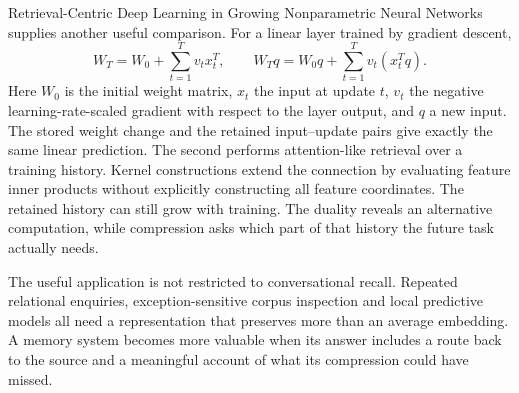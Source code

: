 Retrieval-Centric Deep Learning in Growing Nonparametric Neural Networks~\cite{Reference2026d462c2} supplies another useful comparison. For a linear layer trained by gradient descent,
\[
 W_T=W_0+\sum_{t=1}^T v_tx_t^T,\qquad
 W_Tq=W_0q+\sum_{t=1}^T v_t(x_t^Tq).
\]
Here $W_0$ is the initial weight matrix, $x_t$ the input at update $t$, $v_t$ the negative learning-rate-scaled gradient with respect to the layer output, and $q$ a new input. The stored weight change and the retained input--update pairs give exactly the same linear prediction. The second performs attention-like retrieval over a training history. Kernel constructions extend the connection by evaluating feature inner products without explicitly constructing all feature coordinates. The retained history can still grow with training. The duality reveals an alternative computation, while compression asks which part of that history the future task actually needs.

The useful application is not restricted to conversational recall. Repeated relational enquiries, exception-sensitive corpus inspection and local predictive models all need a representation that preserves more than an average embedding. A memory system becomes more valuable when its answer includes a route back to the source and a meaningful account of what its compression could have missed.

